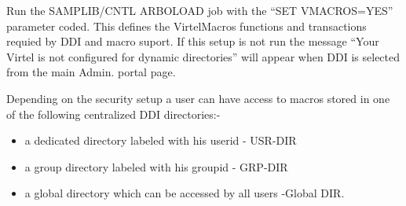 \documentclass[letterpaper,10pt,english]{sphinxmanual}
\begin{document}
\begin{sphinxVerbatim}[commandchars=\\\{\}]
                         
                                                                            
                                                                             
                                                                           
                                                                           
                                                                           
                                                                           
\end{sphinxVerbatim}


Run the SAMPLIB/CNTL ARBOLOAD job with the “SET VMACROS=YES” parameter coded. This defines the VirtelMacros functions and transactions requied by DDI and macro suport. If this setup is not run the message “Your Virtel is not configured for dynamic directories” will appear when DDI is selected from the main Admin. portal page.


Depending on the security setup a user can have access to macros stored in one of the following centralized DDI directories:-
\begin{itemize}
\item {} 
a dedicated directory labeled with his userid - USR-DIR

\item {} 
a group directory labeled with his groupid - GRP-DIR

\item {} 
a global directory which can be accessed by all users -Global DIR.

\end{itemize}
\end{document}

